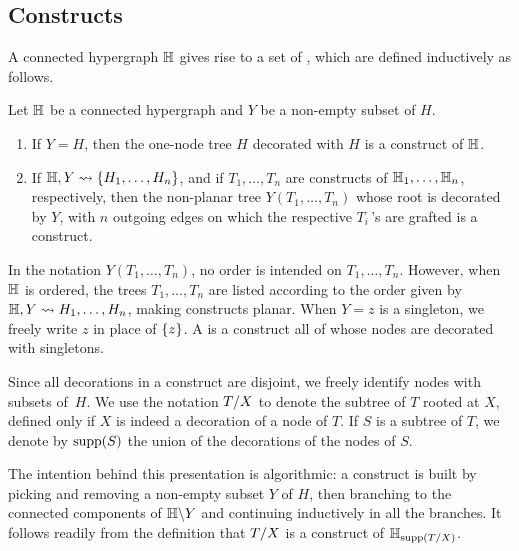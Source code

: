 
\subsection{Constructs}
A {connected} hypergraph ${\mathbb H}$ gives rise to a set of , which are defined inductively as follows.
 
\begin{definition} 
\label{inductive-construct}
Let ${\mathbb H}$ be a connected hypergraph and $Y$ be a non-empty subset of $H$.
\begin{enumerate}
\item  If $Y = H$, then the one-node tree $H$ decorated with $H$ is a construct of ${\mathbb H}$.
\item If ${\mathbb H},Y  \leadsto \{H_1,\ldots,H_n\}$, and if $T_1,\ldots,T_n$ are constructs of ${\mathbb H}_1,\ldots,{\mathbb H}_n$, respectively, then the
non-planar tree $Y(T_1,\ldots,T_n)$ whose root is decorated by $Y$, with $n$ outgoing edges on which the respective $T_i\,$'s are grafted is a construct.  
\end{enumerate}
In the notation $Y(T_1,\ldots,T_n)$, no order is intended on  $T_1,\ldots,T_n$.
However, when ${\mathbb H}$ is ordered, the trees $T_1,\ldots,T_n$ are listed according to the order given by ${\mathbb H},Y  \leadsto H_1,\ldots,H_n$, making constructs planar.
When $Y={z}$ is a singleton, we freely write $z$ in place of $\left\{z\right\}$.
A  is a construct all of whose nodes are  decorated with singletons. 
\end{definition}


Since all decorations in a construct are disjoint, we freely identify nodes with subsets of~$H$. 
We use the notation $T/X$ to denote the  subtree of $T$ rooted at $X$, defined only if $X$ is indeed a decoration of a node of $T$. 
If $S$ is a subtree of $T$, we denote by $\operatorname{supp}(S)$ the union of the decorations of the nodes of $S$.

\begin{rem} \label{subconstruct-restriction}
The intention behind this presentation is algorithmic: a construct is built by picking and removing a non-empty subset $Y$ of $H$, then branching to the connected components of ${\mathbb H}\backslash Y$ and continuing inductively in all the branches.
It follows readily from the definition that $T/X$ is a construct of ${\mathbb H}_{\operatorname{supp}(T/X)}$.
\end{rem}

